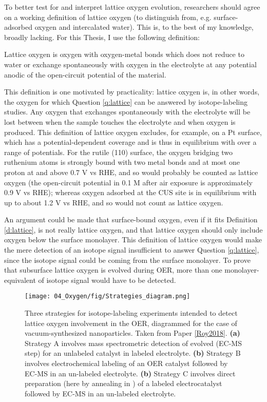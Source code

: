 To better test for and interpret lattice oxygen evolution, researchers should agree on a working definition of lattice oxygen (to distinguish from, e.g. surface-adsorbed oxygen and intercalated water). This is, to the best of my knowledge, broadly lacking. For this Thesis, I use the following definition:

\begin{definition}
	Lattice oxygen is oxygen with oxygen-metal bonds which does not reduce to water or exchange spontaneously with oxygen in the electrolyte at any potential anodic of the open-circuit potential of the material. 
	 \label{d:lattice}
\end{definition}

This definition is one motivated by practicality: lattice oxygen is, in other words, the oxygen for which Question \ref{q:lattice} can be answered by isotope-labeling studies. Any oxygen that exchanges spontaneously with the electrolyte will be lost between when the sample touches the electrolyte and when oxygen is produced. This definition of lattice oxygen excludes, for example,  on a Pt surface, which has a potential-dependent coverage and is thus in equilibrium with  over a range of potentials. For the rutile  (110) surface, the oxygen bridging two ruthenium atoms is strongly bound with two metal bonds and at most one proton at and above 0.7 V vs RHE\cite{Rao2017a}, and so would probably be counted as lattice oxygen (the open-circuit potential in 0.1 M  after air exposure is approximately 0.9 V vs RHE); whereas oxygen adsorbed at the CUS site is in equilibrium with  up to about 1.2 V vs RHE\cite{Rao2017a}, and so would not count as lattice oxygen.

An argument could be made that surface-bound oxygen, even if it fits Definition \ref{d:lattice}, is not really lattice oxygen, and that lattice oxygen should only include oxygen below the surface monolayer. This definition of lattice oxygen would make the mere detection of an isotope signal insufficient to answer Question \ref{q:lattice}, since the isotope signal could be coming from the surface monolayer. To prove that subsurface lattice oxygen is evolved during OER, more than one monolayer-equivalent of isotope signal would have to be detected.

\begin{figure}[t!]
	\centering
	\texttt{[image: 04\_Oxygen/fig/Strategies\_diagram.png]}
	\caption{Three strategies for isotope-labeling experiments intended to detect lattice oxygen involvement in the OER, diagrammed for the case of vacuum-synthesized  nanoparticles. Taken from Paper \ref{Roy2018}. \textbf{(a)} Strategy A involves mass spectrometric detection of evolved  (EC-MS step) for an unlabeled catalyst in labeled electrolyte. \textbf{(b)} Strategy B involves electrochemical labeling of an OER catalyst followed by EC-MS in an un-labeled electrolyte. \textbf{(b)} Strategy C involves direct preparation (here by annealing in ) of a labeled electrocatalyst followed by EC-MS in an un-labeled electrolyte.}
	\label{fig:strategies}
\end{figure}

